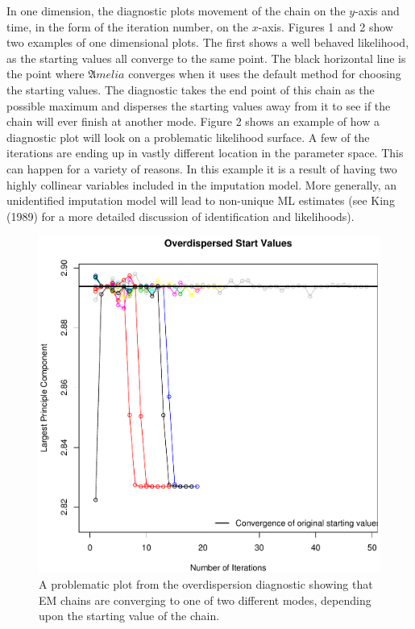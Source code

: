 \documentclass[12pt,titlepage]{article}
\newcommand{\Amelia}{\ensuremath{\mathfrak Amelia} }
\begin{document}
In one dimension, the diagnostic plots movement of the chain on the
$y$-axis and time, in the form of the iteration number, on the
$x$-axis.  Figures 1 and 2 show two examples of one dimensional plots.
The first shows a well behaved likelihood, as the starting values all
converge to the same point.  The black horizontal line is the point
where \Amelia converges when it uses the default method for choosing
the starting values.  The diagnostic takes the end point of this chain
as the possible maximum and disperses the starting values away from it
to see if the chain will ever finish at another mode.  Figure 2 shows
an example of how a diagnostic plot will look on a problematic
likelihood surface.  A few of the iterations are ending up in vastly
different location in the parameter space.  This can happen for a
variety of reasons.  In this example it is a result of having two
highly collinear variables included in the imputation model.  More
generally, an unidentified imputation model will lead to non-unique ML
estimates (see King (1989) for a more detailed discussion of
identification and likelihoods).


\begin{figure}
  \centering \includegraphics[scale=.5]{disperse-bad.pdf}
  \caption{ A problematic plot from the overdispersion diagnostic showing that EM chains are converging to one of two different modes, depending upon the starting value of the chain.}
\end{figure}
\end{document}
